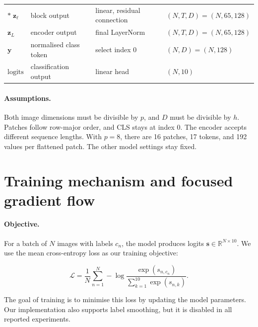 \documentclass{article}
\begin{document}
\begin{table}[h]
{\begin{tabular}{llll}
    $\ast\;\mathbf{z}_\ell$
    & block output
    & linear, residual connection
    & $(N,T,D) = (N,65,128)$ \\

    $\mathbf{z}_L$
    & encoder output
    & final LayerNorm
    & $(N,T,D) = (N,65,128)$ \\

    $\mathbf{y}$
    & normalised class token
    & select index 0
    & $(N,D) = (N,128)$ \\

    $\mathrm{logits}$
    & classification output
    & linear head
    & $(N,10)$ \\

    \bottomrule
  \end{tabular}}

\end{table}

\paragraph{Assumptions.}
Both image dimensions must be divisible by $p$, and $D$ must be divisible by $h$. Patches follow row-major order, and CLS stays at index 0. The encoder accepts different sequence lengths. With $p=8$, there are 16 patches, 17 tokens, and 192 values per flattened patch. The other model settings stay fixed.

\section{Training mechanism and focused gradient flow}

\label{sec:training}

\paragraph{Objective.}
For a batch of $N$ images with labels $c_n$, the model produces
logits $\mathbf{s}\in\mathbb{R}^{N\times 10}$.
We use the mean cross-entropy loss as our training objective:

\begin{equation}
\mathcal{L} = \frac{1}{N}\sum_{n=1}^{N} -\log
\frac{\exp(s_{n,c_n})}{\sum_{k=1}^{10}\exp(s_{n,k})}.
\label{eq:loss}
\end{equation}

The goal of training is to minimise this loss by updating
the model parameters. Our implementation also supports
label smoothing, but it is disabled in all reported experiments.
\end{document}
